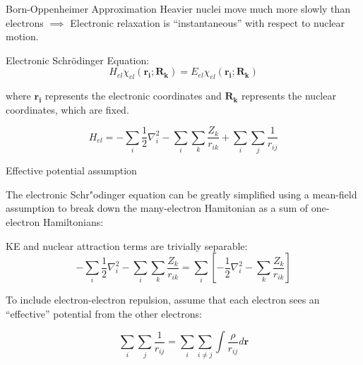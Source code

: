 \documentclass[aspectratio=169]{beamer}
\let \vec \mathbf
\begin{document}
    \begin{frame}{Born-Oppenheimer Approximation}
        Heavier nuclei move much more slowly than electrons $\implies$ Electronic relaxation is ``instantaneous'' with respect to nuclear motion.

        Electronic Schr\"odinger Equation:
        \begin{equation*}
            H_{el} \chi_{el}(\vec{r_i}; \vec{R_k}) = E_{el}\chi_{el}(\vec{r_i}; \vec{R_k})
        \end{equation*}

        where $\vec{r_i}$ represents the electronic coordinates and $\vec{R_k}$ represents the nuclear coordinates, which are fixed.

        \begin{equation*}
            H_{el} = -\sum_i \frac{1}{2}\nabla_i^2
            -\sum_i\sum_k \frac{Z_k}{r_{ik}}
            +\sum_i\sum_j \frac{1}{r_{ij}}
        \end{equation*}

    \end{frame}


    \begin{frame}{Effective potential assumption}

        The electronic Schr"odinger equation can be greatly simplified using a mean-field assumption to break down the many-electron Hamitonian as a sum of one-electron Hamiltonians:

        KE and nuclear attraction terms are trivially separable:
        \begin{equation*}
            -\sum_i \frac{1}{2}\nabla_i^2
            -\sum_i\sum_k \frac{Z_k}{r_{ik}}
            = \sum_i \left[ - \frac{1}{2}\nabla_i^2
            -\sum_k \frac{Z_k}{r_{ik}}\right]
        \end{equation*}

        To include electron-electron repulsion, assume that each electron sees an ``effective'' potential from the other electrons:

        \begin{equation*}
            \sum_i\sum_j \frac{1}{r_{ij}}
            = \sum_i \sum_{i \neq j} \int \frac{\rho}{r_{ij}} d \vec{r}
        \end{equation*}

    \end{frame}
\end{document}

